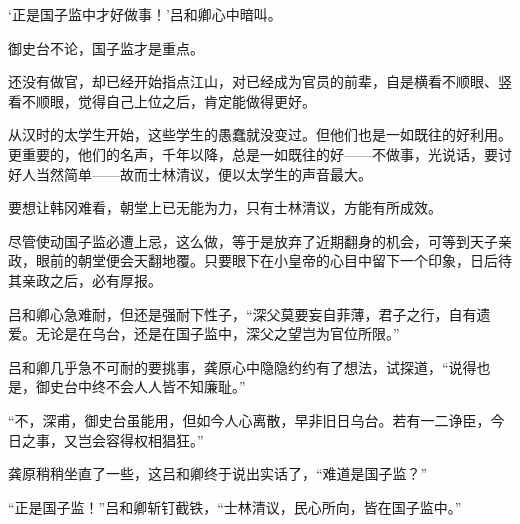 ‘正是国子监中才好做事！’吕和卿心中暗叫。

御史台不论，国子监才是重点。

还没有做官，却已经开始指点江山，对已经成为官员的前辈，自是横看不顺眼、竖看不顺眼，觉得自己上位之后，肯定能做得更好。

从汉时的太学生开始，这些学生的愚蠢就没变过。但他们也是一如既往的好利用。更重要的，他们的名声，千年以降，总是一如既往的好——不做事，光说话，要讨好人当然简单——故而士林清议，便以太学生的声音最大。

要想让韩冈难看，朝堂上已无能为力，只有士林清议，方能有所成效。

尽管使动国子监必遭上忌，这么做，等于是放弃了近期翻身的机会，可等到天子亲政，眼前的朝堂便会天翻地覆。只要眼下在小皇帝的心目中留下一个印象，日后待其亲政之后，必有厚报。

吕和卿心急难耐，但还是强耐下性子，“深父莫要妄自菲薄，君子之行，自有遗爱。无论是在乌台，还是在国子监中，深父之望岂为官位所限。”

吕和卿几乎急不可耐的要挑事，龚原心中隐隐约约有了想法，试探道，“说得也是，御史台中终不会人人皆不知廉耻。”

“不，深甫，御史台虽能用，但如今人心离散，早非旧日乌台。若有一二诤臣，今日之事，又岂会容得权相猖狂。”

龚原稍稍坐直了一些，这吕和卿终于说出实话了，“难道是国子监？”

“正是国子监！”吕和卿斩钉截铁，“士林清议，民心所向，皆在国子监中。”
